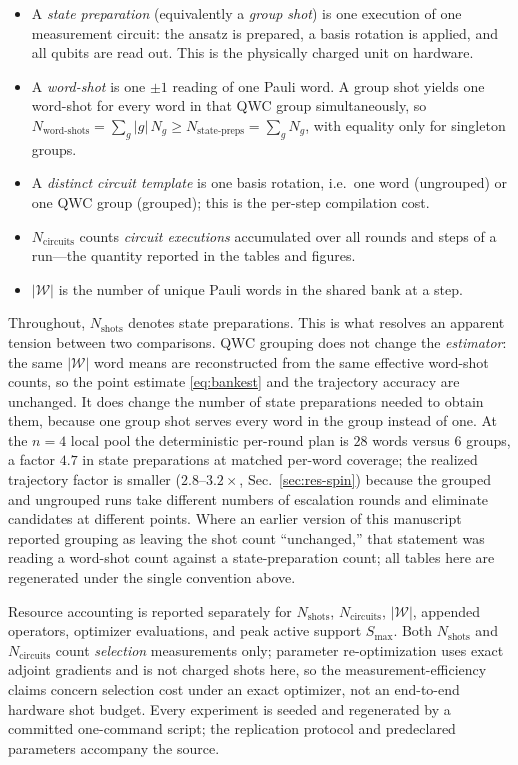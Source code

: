 \documentclass[aps,pra,reprint,superscriptaddress,nofootinbib,floatfix]{revtex4-2}
\newcommand{\calW}{\mathcal{W}}
\begin{document}
\begin{itemize}
\item A \emph{state preparation} (equivalently a \emph{group shot}) is one execution of one measurement circuit: the ansatz is prepared, a basis rotation is applied, and all qubits are read out. This is the physically charged unit on hardware.
\item A \emph{word-shot} is one $\pm1$ reading of one Pauli word. A group shot yields one word-shot for every word in that QWC group simultaneously, so $N_{\text{word-shots}}=\sum_g |g|\,N_g \ge N_{\text{state-preps}}=\sum_g N_g$, with equality only for singleton groups.
\item A \emph{distinct circuit template} is one basis rotation, i.e.\ one word (ungrouped) or one QWC group (grouped); this is the per-step compilation cost.
\item $N_{\text{circuits}}$ counts \emph{circuit executions} accumulated over all rounds and steps of a run---the quantity reported in the tables and figures.
\item $|\calW|$ is the number of unique Pauli words in the shared bank at a step.
\end{itemize}
Throughout, $N_{\text{shots}}$ denotes state preparations. This is what resolves an apparent tension between two comparisons. QWC grouping does not change the \emph{estimator}: the same $|\calW|$ word means are reconstructed from the same effective word-shot counts, so the point estimate \eqref{eq:bankest} and the trajectory accuracy are unchanged. It does change the number of state preparations needed to obtain them, because one group shot serves every word in the group instead of one. At the $n=4$ local pool the deterministic per-round plan is $28$ words versus $6$ groups, a factor $4.7$ in state preparations at matched per-word coverage; the realized trajectory factor is smaller ($2.8$--$3.2\times$, Sec.~\ref{sec:res-spin}) because the grouped and ungrouped runs take different numbers of escalation rounds and eliminate candidates at different points. Where an earlier version of this manuscript reported grouping as leaving the shot count ``unchanged,'' that statement was reading a word-shot count against a state-preparation count; all tables here are regenerated under the single convention above.

Resource accounting is reported separately for $N_{\text{shots}}$, $N_{\text{circuits}}$, $|\calW|$, appended operators, optimizer evaluations, and peak active support $S_{\max}$. Both $N_{\text{shots}}$ and $N_{\text{circuits}}$ count \emph{selection} measurements only; parameter re-optimization uses exact adjoint gradients and is not charged shots here, so the measurement-efficiency claims concern selection cost under an exact optimizer, not an end-to-end hardware shot budget. Every experiment is seeded and regenerated by a committed one-command script; the replication protocol and predeclared parameters accompany the source.
\end{document}
